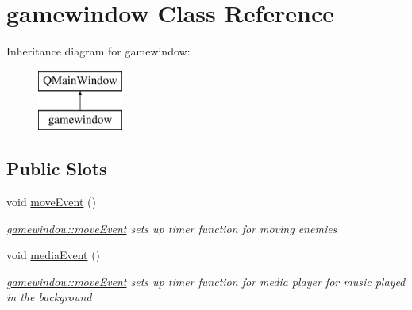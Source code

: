 \hypertarget{classgamewindow}{\section{gamewindow Class Reference}
\label{classgamewindow}
}
Inheritance diagram for gamewindow\-:\begin{figure}[H]
\begin{center}
\leavevmode
\includegraphics[height=2.000000cm]{classgamewindow}
\end{center}
\end{figure}
\subsection*{Public Slots}
\begin{DoxyCompactItemize}
\item 
\hypertarget{classgamewindow_a69fdf6888c6496deedba54f588867415}{void \hyperlink{classgamewindow_a69fdf6888c6496deedba54f588867415}{move\-Event} ()}\label{classgamewindow_a69fdf6888c6496deedba54f588867415}

\begin{DoxyCompactList}\small\item\em \hyperlink{classgamewindow_a69fdf6888c6496deedba54f588867415}{gamewindow\-::move\-Event} sets up timer function for moving enemies \end{DoxyCompactList}\item 
\hypertarget{classgamewindow_a4a43db9e7606e3e24a63baf6d36a7e79}{void \hyperlink{classgamewindow_a4a43db9e7606e3e24a63baf6d36a7e79}{media\-Event} ()}\label{classgamewindow_a4a43db9e7606e3e24a63baf6d36a7e79}

\begin{DoxyCompactList}\small\item\em \hyperlink{classgamewindow_a69fdf6888c6496deedba54f588867415}{gamewindow\-::move\-Event} sets up timer function for media player for music played in the background \end{DoxyCompactList}\end{DoxyCompactItemize}
